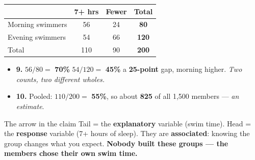\documentclass[aspectratio=169, 11pt]{beamer}
\newcommand{\redink}[1]{{\color{redacc}\bfseries #1}}
\begin{document}
\begin{frame}[t, plain]
  \vspace{2pt}
  \begin{center}
    \small
    \renewcommand{\arraystretch}{1.3}
    \begin{tabular}{@{} l c c c @{}}
    \hline
     & \textbf{7+ hrs} & \textbf{Fewer} & \textbf{Total} \\
    \hline
    Morning swimmers & 56 & 24 & \textbf{80} \\
    Evening swimmers & 54 & 66 & \textbf{120} \\
    \hline
    Total & 110 & 90 & \textbf{200} \\
    \hline
    \end{tabular}
  \end{center}
  \vspace{6pt}
  \begin{itemize}\setlength{\itemsep}{4pt}
    \item \textbf{9.} $56/80 =$ \redink{70\%} \quad $54/120 =$ \redink{45\%} \quad a
          \redink{25-point} gap, morning higher. \emph{Two counts, two different wholes.}
    \item \textbf{10.} Pooled: $110/200 =$ \redink{55\%}, so about \redink{825} of all 1{,}500
          members --- \emph{an estimate}.
  \end{itemize}
  \vspace{6pt}
  \begin{block}{The arrow in the claim}
    Tail = the \textbf{explanatory} variable (swim time). Head = the \textbf{response}
    variable (7+ hours of sleep). They are \textbf{associated}: knowing the group changes what
    you expect. \redink{Nobody built these groups --- the members chose their own swim time.}
  \end{block}
\end{frame}
\end{document}

